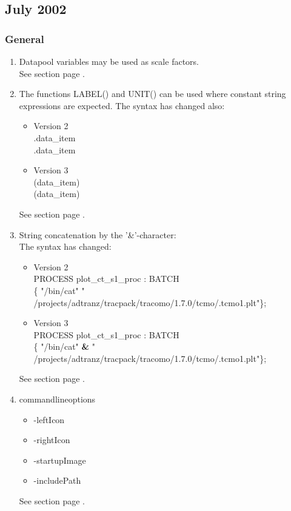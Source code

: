 \subsection{July 2002}
\subsubsection{General}
\begin{enumerate}
\item 
Datapool variables may be used as scale factors. \\
See section  page \pageref{sec:scale}. \\
\item The functions LABEL() and UNIT() can be used where constant string expressions
   are expected.
The syntax has changed also:
\begin{itemize}
\item Version 2 \\
\LABEL.data\_item \\
\UNIT.data\_item \\
\item Version 3 \\
\LABEL (data\_item) \\
\UNIT (data\_item) \\
\end{itemize}
See section  page \pageref{sec:string}. \\
\item 
String concatenation by the '\&'-character: \\
The syntax has changed:
\begin{itemize}
\item Version 2 \\
PROCESS plot\_ct\_s1\_proc : BATCH \\
\{ "/bin/cat"   " /projects/adtranz/tracpack/tracomo/1.7.0/tcmo/.tcmo1.plt"\}; \\
\item Version 3 \\
PROCESS plot\_ct\_s1\_proc : BATCH \\
\{ "/bin/cat" {\bfseries \&} " /projects/adtranz/tracpack/tracomo/1.7.0/tcmo/.tcmo1.plt"\};
\end{itemize}
See section  page \pageref{sec:string}. \\
\item commandlineoptions
\begin{itemize}
\item -leftIcon
\item -rightIcon
\item -startupImage
\item -includePath
\end{itemize}
See section  page \pageref{sec:cl-options}. \\
\end{enumerate}
